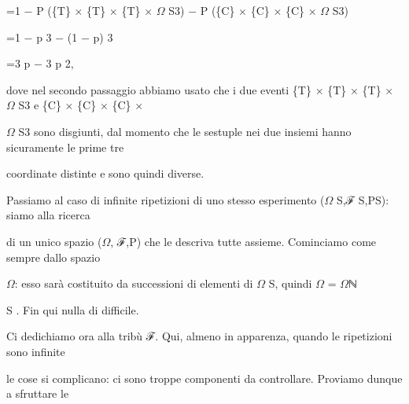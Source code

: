 \documentclass[a4paper,portrait,12pt]{article}
\begin{document}
\begin{flushleft}
=1 $-$ P (\{T\} × \{T\} × \{T\} × $\Omega$ S3) $-$ P (\{C\} × \{C\} × \{C\} × $\Omega$ S3)
\end{flushleft}


\begin{flushleft}
=1 $-$ p 3 $-$ (1 $-$ p) 3
\end{flushleft}


\begin{flushleft}
=3 p $-$ 3 p 2,
\end{flushleft}


\begin{flushleft}
dove nel secondo passaggio abbiamo usato che i due eventi \{T\} × \{T\} × \{T\} × $\Omega$ S3 e \{C\} × \{C\} × \{C\} ×
\end{flushleft}


\begin{flushleft}
$\Omega$ S3 sono disgiunti, dal momento che le sestuple nei due insiemi hanno sicuramente le prime tre
\end{flushleft}


\begin{flushleft}
coordinate distinte e sono quindi diverse.
\end{flushleft}


\begin{flushleft}
Passiamo al caso di infinite ripetizioni di uno stesso esperimento ($\Omega$ S,ℱ S,PS): siamo alla ricerca
\end{flushleft}


\begin{flushleft}
di un unico spazio ($\Omega$, ℱ,P) che le descriva tutte assieme. Cominciamo come sempre dallo spazio
\end{flushleft}


\begin{flushleft}
$\Omega$: esso sar\`{a} costituito da successioni di elementi di $\Omega$ S, quindi $\Omega$ = $\Omega$ℕ
\end{flushleft}


\begin{flushleft}
S . Fin qui nulla di difficile.
\end{flushleft}


\begin{flushleft}
Ci dedichiamo ora alla tribù ℱ. Qui, almeno in apparenza, quando le ripetizioni sono infinite
\end{flushleft}


\begin{flushleft}
le cose si complicano: ci sono troppe componenti da controllare. Proviamo dunque a sfruttare le
\end{flushleft}
\end{document}
